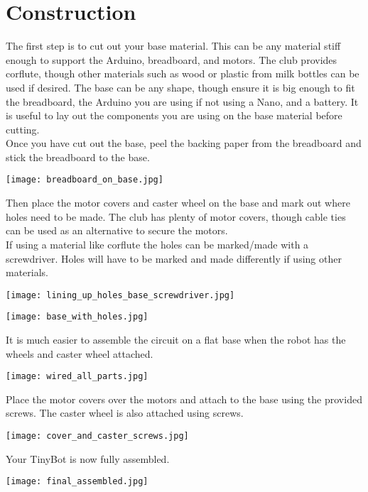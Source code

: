 \documentclass[../TinyBot.tex]{subfiles}
\begin{document}
\section{Construction} \label{sec:construction}

The first step is to cut out your base material. This can be any material stiff enough to support the Arduino, breadboard, and motors. The club provides corflute, though other materials such as wood or plastic from milk bottles can be used if desired. The base can be any shape, though ensure it is big enough to fit the breadboard, the Arduino you are using if not using a Nano, and a battery.
It is useful to lay out the components you are using on the base material before cutting. \\

Once you have cut out the base, peel the backing paper from the breadboard and stick the breadboard to the base.
\begin{center}
    \texttt{[image: breadboard\_on\_base.jpg]}
\end{center}

Then place the motor covers and caster wheel on the base and mark out where holes need to be made. The club has plenty of motor covers, though cable ties can be used as an alternative to secure the motors. \\
If using a material like corflute the holes can be marked/made with a screwdriver. Holes will have to be marked and made differently if using other materials. 
\begin{center}
    \texttt{[image: lining\_up\_holes\_base\_screwdriver.jpg]}
\end{center}
\begin{center}
    \texttt{[image: base\_with\_holes.jpg]}
\end{center}

It is much easier to assemble the circuit on a flat base when the robot has the wheels and caster wheel attached. 


\begin{center}
    \texttt{[image: wired\_all\_parts.jpg]}
\end{center}
Place the motor covers over the motors and attach to the base using the provided screws. The caster wheel is also attached using screws. 

\begin{center}
    \texttt{[image: cover\_and\_caster\_screws.jpg]}
\end{center}

Your TinyBot is now fully assembled.
\begin{center}
    \texttt{[image: final\_assembled.jpg]}
\end{center}
\end{document}
